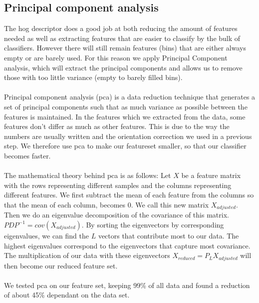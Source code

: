 \documentclass[%
        compressed,
        final,
        notitlepage,
        narroweqnarray,
        inline,
        twoside,
        ]{ieee}
\begin{document}
\subsection{Principal component analysis}
The hog descriptor does a good job at both reducing the amount of features needed as well as extracting features that are easier to classify by the bulk of classifiers. However there will still remain features (bins) that are either always empty or are barely used. For this reason we apply Principal Component analysis, which will extract the principal components and allows us to remove those with too little variance (empty to barely filled bins).\\\\
Principal component analysis (pca) is a data reduction technique that generates a set of
principal components such that as much variance as possible between the features is maintained.  In the features which we extracted from the data, some features don't differ as much as other features. This is due to the way the numbers are usually written and the orientation correction we used in a previous step. We therefore use pca to make our featureset smaller, so that our classifier becomes faster.\\\\
The mathematical theory behind pca is as follows:
Let $X$ be a feature matrix with the rows representing different samples and the
columns representing different features.  We first subtract the mean of each
feature from the columns so that the mean of each column, becomes 0. We call
this new matrix $X_{adjusted}$. Then we do an eigenvalue decomposition of the
covariance of this matrix. $PDP^{-1}=cov(X_{adjusted})$. By sorting the
eigenvectors by corresponding eigenvalues, we can find the $L$ vectors that
contribute most to our data.  The highest eigenvalues correspond to the
eigenvectors that capture most covariance. The multiplication of our data with
these eigenvectors $X_{reduced}=P_L X_{adjusted}$ will then become our reduced feature set.
\cite{Pearson}\\\\
We tested pca on our feature set, keeping 99\% of all data and found a reduction
of about 45\% dependant on the data set. 
\end{document}
